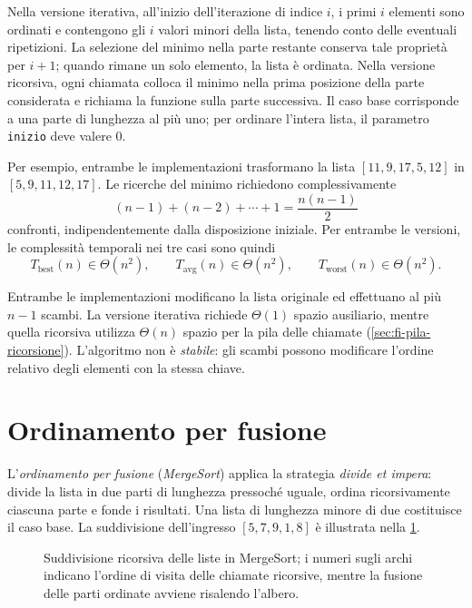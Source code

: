 

Nella versione iterativa, all'inizio dell'iterazione di indice \(i\),
i primi \(i\) elementi sono ordinati e contengono gli \(i\) valori
minori della lista, tenendo conto delle eventuali ripetizioni.
La selezione del minimo nella parte restante conserva tale
proprietà per \(i+1\); quando rimane un solo elemento, la lista
è ordinata. Nella versione ricorsiva, ogni chiamata colloca
il minimo nella prima posizione della parte considerata e
richiama la funzione sulla parte successiva. Il caso base
corrisponde a una parte di lunghezza al più uno; per ordinare
l'intera lista, il parametro \texttt{inizio} deve valere \(0\).

Per esempio, entrambe le implementazioni trasformano la lista
\([11,9,17,5,12]\) in \([5,9,11,12,17]\).
Le ricerche del minimo richiedono complessivamente
\[
  (n-1)+(n-2)+\cdots+1=\frac{n(n-1)}2
\]
confronti, indipendentemente dalla disposizione iniziale.
Per entrambe le versioni, le complessità temporali nei tre casi
sono quindi
\[
  T_{\mathrm{best}}(n)\in\Theta(n^2),\qquad
  T_{\mathrm{avg}}(n)\in\Theta(n^2),\qquad
  T_{\mathrm{worst}}(n)\in\Theta(n^2).
\]

Entrambe le implementazioni modificano la lista originale ed
effettuano al più \(n-1\) scambi. La versione iterativa richiede
\(\Theta(1)\) spazio ausiliario, mentre quella ricorsiva utilizza
\(\Theta(n)\) spazio per la pila delle chiamate
(\cref{sec:fi-pila-ricorsione}). L'algoritmo non è \emph{stabile}:
gli scambi possono modificare l'ordine relativo degli elementi
con la stessa chiave.

\section{Ordinamento per fusione}
\label{sec:fi-ordinamento-fusione}

L'\emph{ordinamento per fusione} (\emph{MergeSort}) applica la
strategia \emph{divide et impera}: divide la lista in due parti di
lunghezza pressoché uguale, ordina ricorsivamente ciascuna parte e
fonde i risultati. Una lista di lunghezza minore di due costituisce
il caso base. La suddivisione dell'ingresso \([5,7,9,1,8]\) è
illustrata nella \cref{fig:fi-merge-sort-suddivisione}.

\begin{figure}[htbp]
  \centering
  
  \caption{Suddivisione ricorsiva delle liste in MergeSort; i numeri
  sugli archi indicano l'ordine di visita delle chiamate ricorsive,
  mentre la fusione delle parti ordinate avviene risalendo l'albero.}
  \label{fig:fi-merge-sort-suddivisione}
\end{figure}

